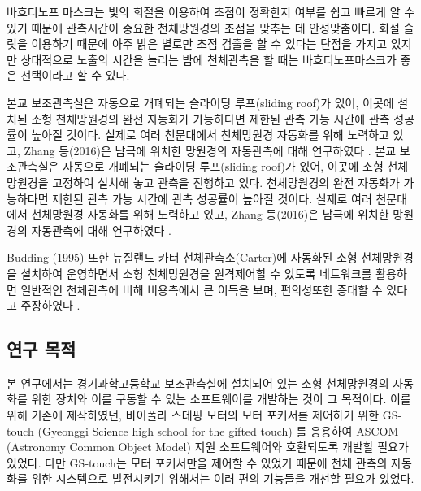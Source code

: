 바흐티노프 마스크는 빛의 회절을 이용하여 초점이 정확한지 여부를  쉽고 빠르게 알 수 있기 때문에 관측시간이 중요한 천체망원경의 초점을 맞추는 데 안성맞춤이다. 회절 슬릿을 이용하기 때문에 아주 밝은 별로만 초점 검출을 할 수 있다는 단점을 가지고 있지만 상대적으로 노출의 시간을 늘리는 밤에 천체관측을 할 때는 바흐티노프마스크가 좋은 선택이라고 할 수 있다.

본교 보조관측실은 자동으로 개폐되는 슬라이딩 루프(sliding roof)가 있어, 이곳에 설치된 소형 천체망원경의  완전 자동화가 가능하다면 제한된 관측 가능 시간에 관측 성공률이 높아질 것이다. 실제로 여러 천문대에서 천체망원경 자동화를 위해 노력하고 있고, Zhang 등(2016)은 남극에 위치한 망원경의 자동관측에 대해 연구하였다 .\cite{Zhang2016}
본교 보조관측실은 자동으로 개폐되는 슬라이딩 루프(sliding roof)가 있어, 이곳에 소형 천체망원경을 고정하여 설치해 놓고 관측을 진행하고 있다. 천체망원경의 완전 자동화가 가능하다면 제한된 관측 가능 시간에 관측 성공률이 높아질 것이다. 실제로 여러 천문대에서 천체망원경 자동화를 위해 노력하고 있고, Zhang 등(2016)은 남극에 위치한 망원경의 자동관측에 대해 연구하였다 \cite{Zhang2016}.

Budding (1995) 또한 뉴질랜드 카터 천체관측소(Carter)에 자동화된 소형 천체망원경을 설치하여 운영하면서 소형 천체망원경을 원격제어할 수 있도록 네트워크를 활용하면 일반적인 천체관측에 비해 비용측에서 큰 이득을 보며, 편의성또한 증대할 수 있다고 주장하였다 \cite{budding1995global}.



\subsection{연구 목적}


본 연구에서는 경기과학고등학교 보조관측실에 설치되어 있는 소형 천체망원경의 자동화를 위한 장치와 이를 구동할 수 있는 소프트웨어를 개발하는 것이 그 목적이다. 이를 위해 기존에 제작하였던, 바이폴라 스테핑 모터의 모터 포커서를 제어하기 위한 GS-touch (Gyeonggi Science high school for the gifted touch) 를 응용하여 ASCOM (Astronomy Common Object Model) 지원 소프트웨어와 호환되도록 개발할 필요가 있었다. 다만 GS-touch는 모터 포커서만을 제어할 수 있었기 때문에 천체 관측의 자동화를 위한 시스템으로 발전시키기 위해서는 여러 편의 기능들을 개선할 필요가 있었다.


